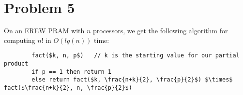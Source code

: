 \documentclass{article}
\providecommand{\prob}[1]{\section*{Problem #1}}
\begin{document}
    \prob{5}
    On an EREW PRAM with $n$ processors, we get the following algorithm for computing $n!$ in $O(lg(n))$ time:\\
    \begin{lstlisting}
        fact($k, n, p$)   // k is the starting value for our partial product
        if p == 1 then return 1
        else return fact($k, \frac{n+k}{2}, \frac{p}{2}$) $\times$ fact($\frac{n+k}{2}, n, \frac{p}{2}$)
    \end{lstlisting}
    
\end{document}
